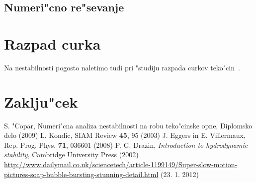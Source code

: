 \documentclass[a4paper,10pt]{article}
\begin{document}
\subsection{Numeri"cno re"sevanje}

\section{Razpad curka}

Na nestabilnosti pogosto naletimo tudi pri "studiju razpada curkov teko"cin~\cite{eggers}. 


\section{Zaklju"cek}

\begin{thebibliography}{3}
   S. "Copar, Numeri"cna analiza nestabilnosti na robu teko"cinske opne, Diplomsko delo (2009)
   L. Kondic, SIAM Review \textbf{45}, 95 (2003)
   J. Eggers in E. Villermaux, Rep. Prog. Phys. \textbf{71}, 036601 (2008)
   P. G. Drazin, \textit{Introduction to hydrodynamic stability}, Cambridge University Press (2002)
   \url{http://www.dailymail.co.uk/sciencetech/article-1199149/Super-slow-motion-pictures-soap-bubble-bursting-stunning-detail.html} (23. 1. 2012)
\end{thebibliography}
\end{document}
